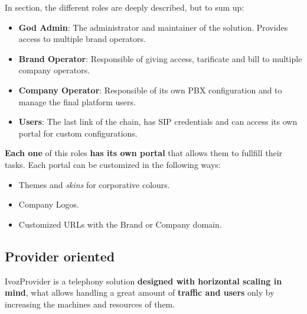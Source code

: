 \documentclass[letterpaper,10pt,english]{sphinxmanual}
\begin{document}
\noindent{}

In {\hyperref[basics/operation_roles/index:operation\string-roles]{}} section, the different roles are deeply
described, but to sum up:
\begin{itemize}
\item {} 
\textbf{God Admin}: The administrator and maintainer of the solution. Provides
access to multiple brand operators.

\item {} 
\textbf{Brand Operator}: Responsible of giving access, tarificate and bill to
multiple company operators.

\item {} 
\textbf{Company Operator}: Responsible of its own PBX configuration and to
manage the final platform users.

\item {} 
\textbf{Users}: The last link of the chain, has SIP credentials and can access
its own portal for custom configurations.

\end{itemize}

\textbf{Each one} of this roles \textbf{has its own portal} that allows them to
fullfill their tasks. Each portal can be customized in the following
ways:
\begin{itemize}
\item {} 
Themes and \emph{skins} for corporative colours.

\item {} 
Company Logos.

\item {} 
Customized URLs with the Brand or Company domain.

\end{itemize}


\subsection{Provider oriented}
\label{basics/intro/what_is_ivozprovider:operator-oriented}\label{basics/intro/what_is_ivozprovider:provider-oriented}
IvozProvider is a telephony solution \textbf{designed with horizontal scaling
in mind}, what allows handling a great amount of \textbf{traffic and users}
only by increasing the machines and resources of them.
\end{document}
